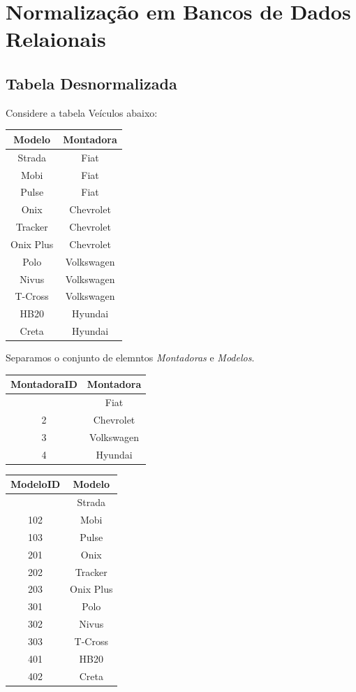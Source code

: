 \documentclass[
]{book}
\begin{document}
\section{Normalização em Bancos de Dados Relaionais}\label{normalizauxe7uxe3o-em-bancos-de-dados-relaionais}

\subsection{Tabela Desnormalizada}\label{tabela-desnormalizada}

Considere a tabela Veículos abaixo:

\begin{longtable}[]{@{}cc@{}}
\toprule\noalign{}
Modelo & Montadora \\
\midrule\noalign{}
\endhead
\bottomrule\noalign{}
\endlastfoot
Strada & Fiat \\
Mobi & Fiat \\
Pulse & Fiat \\
Onix & Chevrolet \\
Tracker & Chevrolet \\
Onix Plus & Chevrolet \\
Polo & Volkswagen \\
Nivus & Volkswagen \\
T-Cross & Volkswagen \\
HB20 & Hyundai \\
Creta & Hyundai \\
\end{longtable}

Separamos o conjunto de elemntos \emph{Montadoras} e \emph{Modelos}.

\begin{longtable}[]{@{}cc@{}}
\toprule\noalign{}
MontadoraID & Montadora \\
\midrule\noalign{}
\endhead
\bottomrule\noalign{}
\endlastfoot
1 & Fiat \\
2 & Chevrolet \\
3 & Volkswagen \\
4 & Hyundai \\
\end{longtable}

\begin{longtable}[]{@{}cc@{}}
\toprule\noalign{}
ModeloID & Modelo \\
\midrule\noalign{}
\endhead
\bottomrule\noalign{}
\endlastfoot
101 & Strada \\
102 & Mobi \\
103 & Pulse \\
201 & Onix \\
202 & Tracker \\
203 & Onix Plus \\
301 & Polo \\
302 & Nivus \\
303 & T-Cross \\
401 & HB20 \\
402 & Creta \\
\end{longtable}
\end{document}
